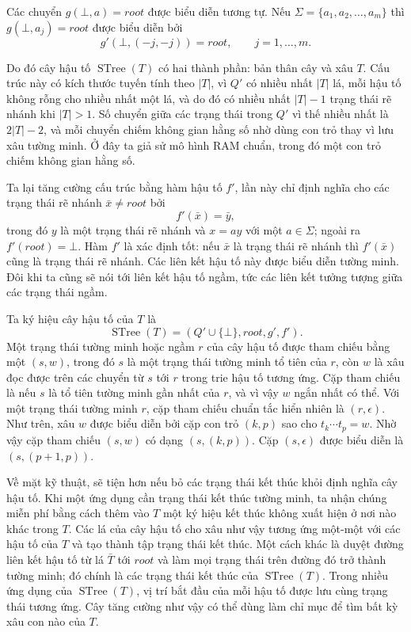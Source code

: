 \documentclass[11pt]{article}
\newcommand{\eps}{\epsilon}
\newcommand{\STree}{\operatorname{STree}}
\begin{document}
Các chuyển $g(\bot,a)=\mathit{root}$ được biểu diễn tương tự. Nếu
$\Sigma=\{a_1,a_2,\ldots,a_m\}$ thì $g(\bot,a_j)=\mathit{root}$ được biểu diễn
bởi
\[
  g'(\bot,(-j,-j))=\mathit{root},\qquad j=1,\ldots,m.
\]

Do đó cây hậu tố $\STree(T)$ có hai thành phần: bản thân cây và xâu $T$. Cấu
trúc này có kích thước tuyến tính theo $|T|$, vì $Q'$ có nhiều nhất $|T|$ lá,
mỗi hậu tố không rỗng cho nhiều nhất một lá, và do đó có nhiều nhất $|T|-1$
trạng thái rẽ nhánh khi $|T|>1$. Số chuyển giữa các trạng thái trong $Q'$ vì
thế nhiều nhất là $2|T|-2$, và mỗi chuyển chiếm không gian hằng số nhờ dùng
con trỏ thay vì lưu xâu tường minh. Ở đây ta giả sử mô hình RAM chuẩn, trong
đó một con trỏ chiếm không gian hằng số.

Ta lại tăng cường cấu trúc bằng hàm hậu tố $f'$, lần này chỉ định nghĩa cho
các trạng thái rẽ nhánh $\bar{x}\ne\mathit{root}$ bởi
\[
  f'(\bar{x})=\bar{y},
\]
trong đó $y$ là một trạng thái rẽ nhánh và $x=ay$ với một $a\in\Sigma$; ngoài
ra $f'(\mathit{root})=\bot$. Hàm $f'$ là xác định tốt: nếu $\bar{x}$ là trạng
thái rẽ nhánh thì $f'(\bar{x})$ cũng là trạng thái rẽ nhánh. Các liên kết hậu
tố này được biểu diễn tường minh. Đôi khi ta cũng sẽ nói tới liên kết hậu tố
ngầm, tức các liên kết tưởng tượng giữa các trạng thái ngầm.

Ta ký hiệu cây hậu tố của $T$ là
\[
  \STree(T)=(Q'\cup\{\bot\},\mathit{root},g',f').
\]
Một trạng thái tường minh hoặc ngầm $r$ của cây hậu tố được tham chiếu bằng
một  $(s,w)$, trong đó $s$ là một trạng thái tường minh
tổ tiên của $r$, còn $w$ là xâu đọc được trên các chuyển từ $s$ tới $r$ trong
trie hậu tố tương ứng. Cặp tham chiếu là  nếu $s$ là tổ tiên
tường minh gần nhất của $r$, và vì vậy $w$ ngắn nhất có thể. Với một trạng
thái tường minh $r$, cặp tham chiếu chuẩn tắc hiển nhiên là $(r,\eps)$. Như
trên, xâu $w$ được biểu diễn bởi cặp con trỏ $(k,p)$ sao cho
$t_k\cdots t_p=w$. Nhờ vậy cặp tham chiếu $(s,w)$ có dạng $(s,(k,p))$. Cặp
$(s,\eps)$ được biểu diễn là $(s,(p+1,p))$.

Về mặt kỹ thuật, sẽ tiện hơn nếu bỏ các trạng thái kết thúc khỏi định nghĩa
cây hậu tố. Khi một ứng dụng cần trạng thái kết thúc tường minh, ta nhận chúng
miễn phí bằng cách thêm vào $T$ một ký hiệu kết thúc không xuất hiện ở nơi nào
khác trong $T$. Các lá của cây hậu tố cho xâu như vậy tương ứng một-một với
các hậu tố của $T$ và tạo thành tập trạng thái kết thúc. Một cách khác là
duyệt đường liên kết hậu tố từ lá $\bar{T}$ tới $\mathit{root}$ và làm mọi
trạng thái trên đường đó trở thành tường minh; đó chính là các trạng thái kết
thúc của $\STree(T)$. Trong nhiều ứng dụng của $\STree(T)$, vị trí bắt đầu của
mỗi hậu tố được lưu cùng trạng thái tương ứng. Cây tăng cường như vậy có thể
dùng làm chỉ mục để tìm bất kỳ xâu con nào của $T$.
\end{document}
